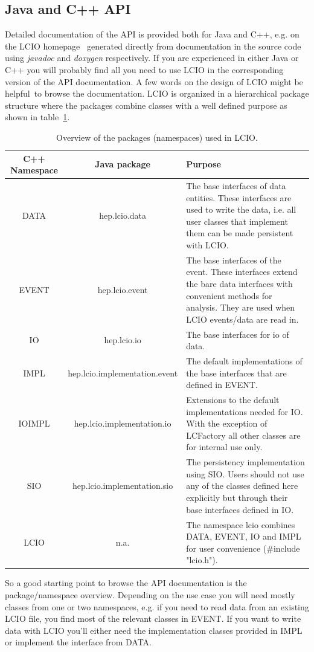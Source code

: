 \documentclass[twoside]{article}
\begin{document}
\subsection{Java and C++ API} \label{sec_api}
Detailed documentation of the API is provided both for Java and C++, e.g. on the 
LCIO homepage~\cite{lcio_home} generated directly  from documentation in the source code using 
{\em javadoc} and {\em doxygen} respectively.   
If you are experienced in either Java or C++ you will probably 
find all you need to use LCIO in the corresponding version of the API documentation.
A few words on the design of LCIO might be helpful\ to browse the documentation.
LCIO is organized in a hierarchical package structure where the packages combine classes
with a well defined purpose as shown in table~\ref{tab_pkg}.  
\begin{table}
\begin{center}
\begin{tabular}{|c|c|p{6cm}|}
\hline
\rule[-5mm]{0mm}{10mm} C++ Namespace  &  Java package    &  Purpose \\ \hline \hline

 DATA  &  hep.lcio.data   &  The base interfaces of data entities.
 These interfaces are used to write the data, i.e. all user classes 
 that implement them can be made persistent with LCIO.\\ \hline
 EVENT  &  hep.lcio.event   & The base interfaces of the event.
 These interfaces extend the bare data interfaces with convenient 
 methods for analysis. They are used when LCIO events/data are read in. \\ \hline
 IO  &  hep.lcio.io   &  The base interfaces for io of data.\\ \hline
 IMPL  &  hep.lcio.implementation.event   & The default implementations of
 the base interfaces that are defined in EVENT. \\ \hline
 IOIMPL  &  hep.lcio.implementation.io   &  Extensions to the default implementations
 needed for IO. With the exception of LCFactory all other classes are for internal use only.\\ \hline
 SIO  &  hep.lcio.implementation.sio   & The persistency implementation using SIO.
 Users should not use any of the classes defined here explicitly but through their
 base interfaces defined in IO. \\ \hline
 LCIO  &   n.a. & The namespace lcio combines DATA, EVENT, IO and IMPL for user convenience
(\#include "lcio.h"). \\ \hline

\end{tabular}
\end{center}
\caption{Overview of the packages (namespaces) used in LCIO.}
\label{tab_pkg}
\end{table}
So a good starting point to browse the API documentation is the package/namespace overview.
Depending on the use case you will need mostly classes from one or two namespaces, e.g. if you need 
to read data from an existing LCIO file, you find most of the relevant classes in EVENT.
If you want to write data with LCIO you'll either need the implementation classes provided in IMPL
or implement the interface from DATA.
\end{document}

